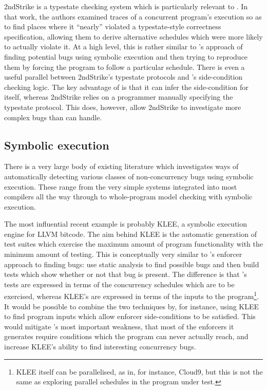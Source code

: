 2ndStrike\cite{Gao2011} is a typestate checking system which is
particularly relevant to {\technique}.  In that work, the authors
examined traces of a concurrent program's execution so as to find
places where it ``nearly'' violated a typestate-style correctness
specification, allowing them to derive alternative schedules which
were more likely to actually violate it.  At a high level, this is
rather similar to {\technique}'s approach of finding potential bugs
using symbolic execution and then trying to reproduce them by forcing
the program to follow a particular schedule.  There is even a useful
parallel between 2ndStrike's typestate protocols and {\technique}'s
side-condition checking logic.  The key advantage of {\technique} is
that it can infer the side-condition for itself, whereas 2ndStrike
relies on a programmer manually specifying the typestate protocol.
This does, however, allow 2ndStrike to investigate more complex bugs
than {\technique} can handle.

\subsection{Symbolic execution}

There is a very large body of existing literature which investigates
ways of automatically detecting various classes of non-concurrency
bugs using symbolic execution.  These range from the very simple
systems integrated into most compilers\needCite{} all the way through
to whole-program model checking with symbolic
execution\cite{Ball2011}.  

The most influential recent example is probably KLEE\cite{Cadar}, a
symbolic execution engine for LLVM bitcode\cite{Lattner2013}.  The aim
behind KLEE is the automatic generation of test suites which exercise
the maximum amount of program functionality with the minimum amount of
testing.  This is conceptually very similar to {\technique}'s enforcer
approach to finding bugs: use static analysis to find possible bugs
and then build tests which show whether or not that bug is present.
The difference is that {\technique}'s tests are expressed in terms of
the concurrency schedules which are to be exercised, whereas KLEE's
are expressed in terms of the inputs to the program\footnote{KLEE
  itself can be parallelised, as in, for instance,
  Cloud9\cite{Ciortea2010}, but this is not the same as exploring
  parallel schedules in the program under test.}.  It would be
possible to combine the two techniques by, for instance, using KLEE to
find program inputs which allow {\technique} enforcer side-conditions
to be satisfied.  This would mitigate {\technique}'s most important
weakness, that most of the enforcers it generates require conditions
which the program can never actually reach, and increase KLEE's
ability to find interesting concurrency bugs.

